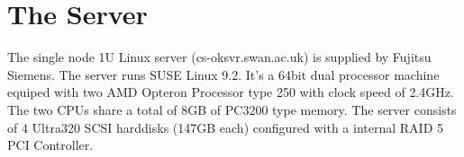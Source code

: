 \documentclass{book}
\begin{document}
\section{The Server}
\label{sec:computingserver}

The single node 1U Linux server (cs-oksvr.swan.ac.uk) is supplied by Fujitsu Siemens. The server runs SUSE Linux 9.2. It's a 64bit dual processor machine equiped with two AMD Opteron Processor type 250 with clock speed of 2.4GHz. The two CPUs share a total of 8GB of PC3200 type memory. The server consists of 4 Ultra320 SCSI harddisks (147GB each) configured with a internal RAID 5 PCI Controller. 










\BibliographyOKlibrary
\end{document}
